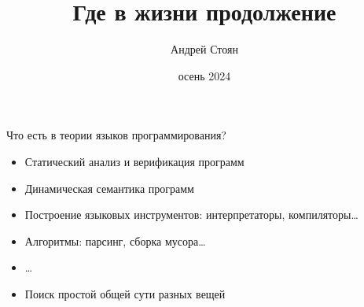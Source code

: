 
\newif\ifhandout




\title[Где в жизни продолжение]{Где в жизни продолжение}
\author[Андрей Стоян]{Андрей Стоян}
\date{осень 2024}



    \setcounter{framenumber}{-1}
    \maketitle

    \begin{frame}[fragile]{Что есть в теории языков программирования?}
        \begin{itemize}
            \item[\practical] Статический анализ и верификация программ
            \item[\practical] Динамическая семантика программ
            \item[\practical] Построение языковых инструментов: интерпретаторы, компиляторы\ldots
            \item[\practical] Алгоритмы: парсинг, сборка мусора\ldots
            \item[\practical] \ldots
            \item[\answer] \pause Поиск простой общей сути разных вещей
        \end{itemize}
    \end{frame}

